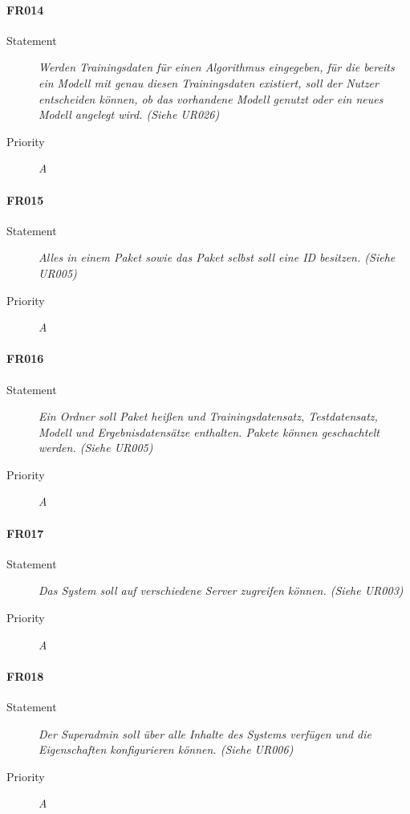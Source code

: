\paragraph{FR014}
\begin{description}
  \item [Statement] 
    \textit{Werden Trainingsdaten für einen Algorithmus eingegeben, für die bereits ein Modell mit genau diesen Trainingsdaten existiert, soll der Nutzer entscheiden können, ob das vorhandene Modell genutzt oder ein neues Modell angelegt wird.
	(Siehe UR026)}
  \item [Priority] \textit{A}
\end{description}

\paragraph{FR015}
\begin{description}
  \item [Statement] 
    \textit{Alles in einem \gls{Paket} sowie das \gls{Paket} selbst soll eine ID besitzen.
	(Siehe UR005)}
  \item [Priority] \textit{A}
\end{description}

\paragraph{FR016}
\begin{description}
  \item [Statement] 
    \textit{Ein Ordner soll \gls{Paket} heißen und Trainingsdatensatz, Testdatensatz, Modell und Ergebnisdatensätze enthalten. \gls{Paket}e können geschachtelt werden.
	(Siehe UR005)}
  \item [Priority] \textit{A}
\end{description}

\paragraph{FR017}
\begin{description}
  \item [Statement] 
    \textit{Das System soll auf verschiedene Server zugreifen können.
	(Siehe UR003)}
  \item [Priority] \textit{A}
\end{description}

\paragraph{FR018}
\begin{description}
  \item [Statement] 
    \textit{Der \gls{Superadmin} soll über alle Inhalte des Systems verfügen und die Eigenschaften konfigurieren können.
	(Siehe UR006)}
  \item [Priority] \textit{A}
\end{description}

